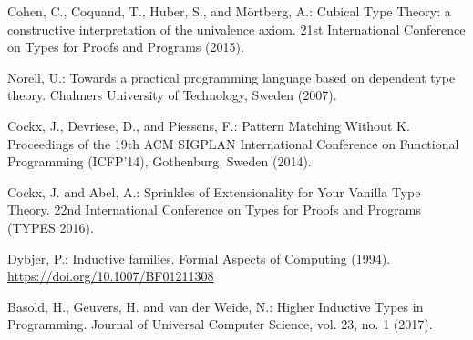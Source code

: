 \documentclass[runningheads]{llncs}
\begin{document}
\begin{thebibliography}{4}
 Cohen, C., Coquand, T., Huber, S., and M{\"o}rtberg, A.: Cubical Type Theory: a constructive interpretation of the univalence axiom. 21st International Conference on Types for Proofs and Programs (2015).

 Norell, U.: Towards a practical programming language based on dependent type theory. Chalmers University of Technology, Sweden (2007).

 Cockx, J., Devriese, D., and Piessens, F.: Pattern Matching Without K. Proceedings of the 19th ACM SIGPLAN International Conference on Functional Programming (ICFP'14), Gothenburg, Sweden (2014).

 Cockx, J. and Abel, A.: Sprinkles of Extensionality for Your Vanilla Type Theory. 22nd International Conference on Types for Proofs and Programs (TYPES 2016).

 Dybjer, P.: Inductive families. Formal Aspects of Computing (1994). \url{https://doi.org/10.1007/BF01211308}

 Basold, H., Geuvers, H. and van der Weide, N.: Higher Inductive Types in Programming. Journal of Universal Computer Science, vol. 23, no. 1 (2017).

\end{thebibliography}
\end{document}
